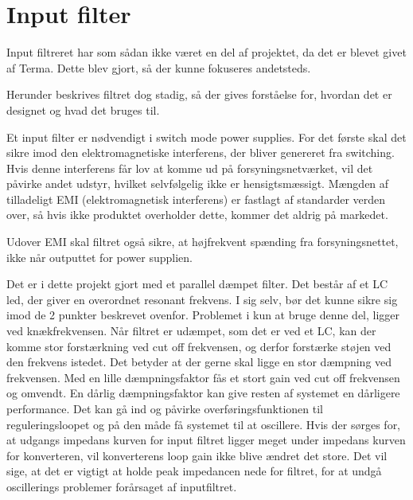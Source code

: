 \section{Input filter}
Input filtreret har som sådan ikke været en del af projektet, da det er blevet givet af Terma. Dette blev gjort, så der kunne fokuseres andetsteds. 

\noindent Herunder beskrives filtret dog stadig, så der gives forståelse for, hvordan det er designet og hvad det bruges til.

\noindent \cite{Inputfilter} Et input filter er nødvendigt i switch mode power supplies. For det første skal det sikre imod den elektromagnetiske interferens, der bliver genereret fra switching. Hvis denne interferens får lov at komme ud på forsyningsnetværket, vil det påvirke andet udstyr, hvilket selvfølgelig ikke er hensigtsmæssigt. Mængden af  tilladeligt EMI (elektromagnetisk interferens) er fastlagt af standarder verden over, så hvis ikke produktet overholder dette, kommer det aldrig på markedet.

\noindent Udover EMI skal filtret også sikre, at højfrekvent spænding fra forsyningsnettet, ikke når outputtet for power supplien. 

Det er i dette projekt gjort med et parallel dæmpet filter. Det består af et LC led, der giver en overordnet resonant frekvens. I sig selv, bør det kunne sikre sig imod de 2 punkter beskrevet ovenfor. Problemet i kun at bruge denne del, ligger ved knækfrekvensen. Når filtret er udæmpet, som det er ved et LC, kan der komme stor forstærkning ved cut off frekvensen, og derfor forstærke støjen ved den frekvens istedet. Det betyder at der gerne skal ligge en stor dæmpning ved frekvensen. Med en lille dæmpningsfaktor fås et stort gain ved cut off frekvensen og omvendt. En dårlig dæmpningsfaktor kan give resten af systemet en dårligere performance. Det kan gå ind og påvirke overføringsfunktionen til reguleringsloopet og på den måde få systemet til at oscillere. Hvis der sørges for, at udgangs impedans kurven for input filtret ligger meget under impedans kurven for konverteren, vil konverterens loop gain ikke blive ændret det store. Det vil sige, at det er vigtigt at holde peak impedancen nede for filtret, for at undgå oscillerings problemer forårsaget af inputfiltret.     


